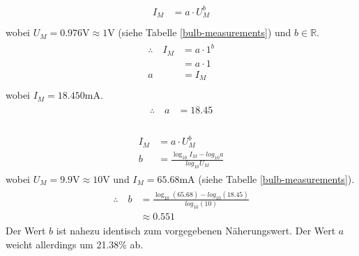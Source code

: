 \documentclass[a4paper, 11pt]{report}
\begin{document}
\begin{align}
    \begin{split}
        I_M &= a \cdot U_M^b\\
    \end{split}
\end{align}
wobei \(U_M = 0.976\si{\volt} \approx 1\si{\volt}\) (siehe Tabelle \ref{bulb-measurements}) und \(b \in \mathbb{R}\).
\begin{align}
    \begin{split}
        \therefore \quad I_M &= a \cdot 1^b\\
        &= a \cdot 1\\
        a &= I_M\\
    \end{split}
\end{align}
wobei \(I_M = 18.450\si{\milli\ampere}\).
\begin{align}
    \begin{split}
        \therefore \quad a &= 18.45\\
    \end{split}
\end{align}

\begin{align}
    \begin{split}
        I_M &= a \cdot U_M^b\\
        b &= \frac{\log_{10} I_M - log_{10} a}{log_{10} U_M}
    \end{split}
\end{align}
wobei \(U_M = 9.9\si{\volt} \approx 10\si{\volt}\) und \(I_M = 65.68\si{\milli\ampere}\) (siehe Tabelle \ref{bulb-measurements}).
\begin{align}
    \begin{split}
        \therefore \quad b &= \frac{\log_{10} \left(65.68\right) - log_{10} \left(18.45\right)}{log_{10} \left(10\right)}\\
        &\approx 0.551
    \end{split}
\end{align}
Der Wert \(b\) ist nahezu identisch zum vorgegebenen Näherungswert. Der Wert \(a\) weicht allerdings  um 21.38\% ab.
\end{document}
